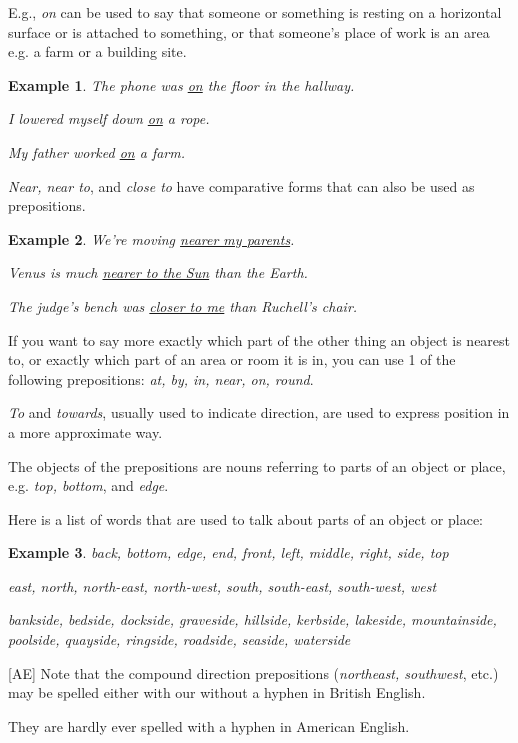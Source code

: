 \documentclass[oneside]{book}
\numberwithin{equation}{section}
\newtheorem{example}{Example}[section]
\begin{document}
E.g., \textit{on} can be used to say that someone or something is resting on a horizontal surface or is attached to something, or that someone's place of work is an area e.g. a farm or a building site.
\begin{example}
    The phone was \underline{on} the floor in the hallway.
    
    I lowered myself down \underline{on} a rope.
    
    My father worked \underline{on} a farm.
\end{example}
%
\noindent{} \textit{Near, near to}, and \textit{close to} have comparative forms that can also be used as prepositions.
\begin{example}
    We're moving \underline{nearer my parents}.
    
    Venus is much \underline{nearer to the Sun} than the Earth.
    
    The judge's bench was \underline{closer to me} than Ruchell's chair.
\end{example}
%
\noindent{} If you want to say more exactly which part of the other thing an object is nearest to, or exactly which part of an area or room it is in, you can use 1 of the following prepositions: \textit{at, by, in, near, on, round}.

\textit{To} and \textit{towards}, usually used to indicate direction, are used to express position in a more approximate way.

%
The objects of the prepositions are nouns referring to parts of an object or place, e.g. \textit{top, bottom}, and \textit{edge}.

Here is a list of words that are used to talk about parts of an object or place:
\begin{example}
    back, bottom, edge, end, front, left, middle, right, side, top
    
    east, north, north-east, north-west, south, south-east, south-west, west
    
    bankside, bedside, dockside, graveside, hillside, kerbside, lakeside, mountainside, poolside, quayside, ringside, roadside, seaside, waterside
\end{example}
%
[AE] Note that the compound direction prepositions (\textit{northeast, southwest}, etc.) may be spelled either with our without a hyphen in British English.

They are hardly ever spelled with a hyphen in American English.
\end{document}

